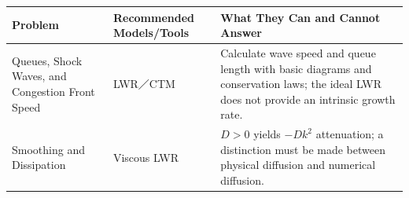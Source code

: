 \documentclass[11pt,a4paper,openany]{book}
\numberwithin{equation}{chapter}
\numberwithin{figure}{chapter}
\numberwithin{table}{chapter}
\begin{document}
\begin{center}
\small
{}
\label{tab:macro-tool-selection}
\begin{tabular}{p{3.0cm}p{4.1cm}p{6.8cm}}
\toprule







Problem




&




 Recommended Models/Tools




&




What They Can and Cannot Answer



\\
\midrule







Queues, Shock Waves, and Congestion Front Speed




& LWR／CTM &




Calculate wave speed and queue length with basic diagrams and conservation laws; the ideal LWR does not provide an intrinsic growth rate.



\\







Smoothing and Dissipation




&




Viscous LWR




&




$D>0$ yields $-Dk^2$ attenuation; a distinction must be made between physical diffusion and numerical diffusion.



\\








\end{tabular}
\end{center}
\end{document}
